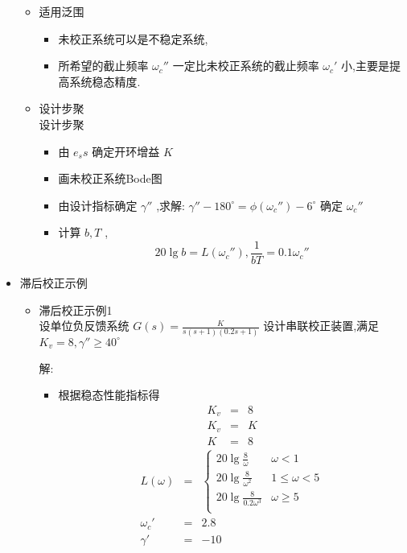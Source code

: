 \documentclass[table]{article}
\begin{document}
\begin{frame}
\begin{itemize}
\begin{itemize}
\item 适用泛围
\label{sec-2-2-10-1-3}%
\begin{itemize}
\item <2->未校正系统可以是不稳定系统,
\item <3->所希望的截止频率 $\omega_c''$ 一定比未校正系统的截止频率 $\omega_c'$ 小,主要是提高系统稳态精度.
\end{itemize}

\item 设计步聚\\
\label{sec-2-2-10-1-4}%
设计步聚
\begin{itemize}
\item 由 $e_ss$ 确定开环增益 $K$
\item 画未校正系统Bode图
\item <2->由设计指标确定 $\gamma''$ ,求解:  $\gamma''-180^{\circ} = \phi(\omega_c'')-6^{\circ}$ 确定 $\omega_c''$
\item <3->计算 $b,T$ , 
         \[20\lg b=L(\omega_c''),\frac{1}{bT}=0.1\omega_c''\]
\end{itemize}
\end{itemize} %

\item 滞后校正示例
\label{sec-2-2-10-2}%
\begin{itemize}

\item 滞后校正示例1\\
\label{sec-2-2-10-2-1}%
设单位负反馈系统 $G(s)=\frac{K}{s(s+1)(0.2s+1)}$ 设计串联校正装置,满足  $K_v=8, \gamma''\geq 40^{\circ}$ 

解:

\begin{itemize}
\item <2->根据稳态性能指标得
      \begin{eqnarray*}
      K_v & = &8 \\
      K_v &= & K \\
       K &=& 8
      \end{eqnarray*}
      \begin{eqnarray*}
      L(\omega) & = & \begin{cases}20\lg\frac{8}{\omega} & \omega <1 \\
                                   20\lg\frac{8}{\omega^2} & 1\leq \omega < 5 \\
                                   20\lg\frac{8}{0.2\omega^3} &  \omega \geq 5 \\  \end{cases}\\
      \omega_c' &=& 2.8 \\
      \gamma' &=& -10 \\
      \end{eqnarray*}
\end{itemize}



\end{itemize}
\end{itemize}
\end{frame}
\end{document}
